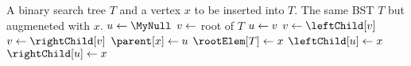 
\begin{algorithmic}[1]
\Require A binary search tree $T$ and a vertex $x$ to be inserted into $T$.
\Ensure The same BST $T$ but augmeneted with $x$.
\State $u \assign \MyNull$
\State $v \leftarrow$ root of $T$
  \State $u \leftarrow v$
    \State $v \assign \leftChild[v]$
  \Else
    \State $v \assign \rightChild[v]$
  \EndIf
\EndWhile
\State $\parent[x] \assign u$
  \State $\rootElem[T] \assign x$
\Else
    \State $\leftChild[u] \assign x$
  \Else
    \State $\rightChild[u] \assign x$
  \EndIf
\EndIf
\end{algorithmic}
